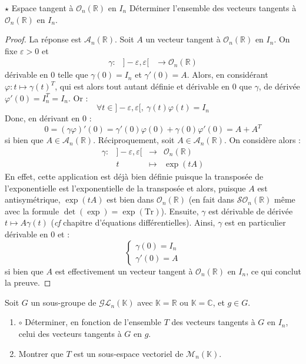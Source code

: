 \documentclass[french,a4paper]{article}
\newcommand{\R}{\mathbb{R}}
\newcommand{\C}{\mathbb{C}}
\newcommand{\K}{\mathbb{K}}
\newcommand{\Tr}{\text{Tr}}
\theoremstyle{plain}
\theoremstyle{definition}
\theoremstyle{remark}
\begin{document}
\begin{ex}[Moulin.CD.63]{$\star$ Espace tangent à $\mathcal{O}_n(\R)$ en $I_n$}
	Déterminer l'ensemble des vecteurs tangents à $\mathcal{O}_n(\R)$ en $I_n$.
\end{ex}
\begin{proof}
	La réponse est $\mathcal{A}_n(\R)$. Soit $A$ un vecteur tangent à $\mathcal{O}_n(\R)$ en $I_n$. On fixe $\varepsilon>0$ et $$\begin{array}{lrcl}
		\gamma :&]-\varepsilon ,\varepsilon[&\longrightarrow \mathcal{O}_n(\R)
	\end{array}$$ dérivable en $0$ telle que $\gamma(0)=I_n$ et $\gamma'(0)=A$. Alors, en considérant $\varphi:t\mapsto\gamma(t)^T$, qui est alors tout autant définie et dérivable en $0$ que $\gamma$, de dérivée $\varphi'(0)=I_n^T=I_n$. Or : $$\forall t\in]-\varepsilon, \varepsilon[,\ \gamma(t)\varphi(t)=I_n$$ Donc, en dérivant en $0$ : $$0=(\gamma\varphi)'(0)=\gamma'(0)\varphi(0)+\gamma(0)\varphi'(0)=A+A^T$$ si bien que $A\in\mathcal{A}_n(\R)$. Réciproquement, soit $A\in\mathcal{A}_n(\R)$. On considère alors : $$\begin{array}{lrcl}
		\gamma:&]-\varepsilon,\varepsilon[&\longrightarrow&\mathcal{O}_n(\R) \\
		&t&\longmapsto&\exp(tA)
	\end{array}$$ En effet, cette application est déjà bien définie puisque la transposée de l'exponentielle est l'exponentielle de la transposée et alors, puisque $A$ est antisymétrique, $\exp(tA)$ est bien dans $\mathcal{O}_n(\R)$ (en fait dans $\mathcal{SO}_n(\R)$ même avec la formule $\det(\exp)=\exp(\Tr)$). Ensuite, $\gamma$ est dérivable de dérivée $t\mapsto A\gamma(t)$ (\textit{cf} chapitre d'équations différentielles). Ainsi, $\gamma$ est en particulier dérivable en $0$ et : $$\begin{cases}
		\gamma(0)=I_n \\
		\gamma'(0)=A
	\end{cases}$$ si bien que $A$ est effectivement un vecteur tangent à $\mathcal{O}_n(\R)$ en $I_n$, ce qui conclut la preuve.
\end{proof}

\begin{ex}[Moulin.CD.64]{}
	Soit $G$ un sous-groupe de $\mathcal{GL}_n(\K)$ avec $\K=\R$ ou $\K=\C$, et $g\in G$.
	\begin{enumerate}
		\item $\circ$ Déterminer, en fonction de l'ensemble $T$ des vecteurs tangents à $G$ en $I_n$, celui des vecteurs tangents à $G$ en $g$.
		\item Montrer que $T$ est un sous-espace vectoriel de $\mathcal{M}_n(\K)$.
	\end{enumerate}
\end{ex}
\end{document}
